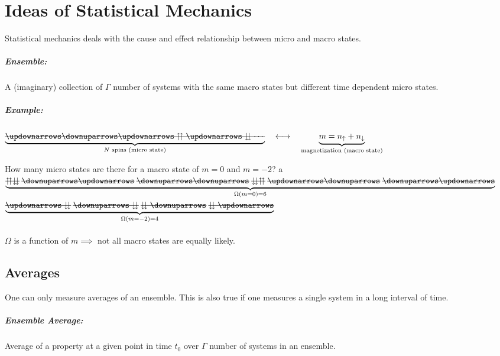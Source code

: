 \chapter{Ideas of Statistical Mechanics}

Statistical mechanics deals with the cause and effect relationship between micro and macro states.
\paragraph{Ensemble:} A (imaginary) collection of $\Gamma$ number of systems with the same macro states but different time dependent micro states.



\paragraph{Example:}

$\underbrace{\stkout{\updownarrows\downuparrows \updownarrows \upuparrows \updownarrows\downdownarrows \cdots}}_{N\textrm{ spins (micro state)}} \quad \longleftrightarrow \quad \underbrace{m=n_\uparrow + n_\downarrow}_\textrm{magnetization (macro state)}$

\begin{problem}{How many micro states are there for a macro state of $m=0$ and $m=-2$?}
a
$\underbrace{
\stkout{\upuparrows\downdownarrows}\;
\stkout{\downuparrows\updownarrows}\;
\stkout{\downuparrows\downuparrows}\;
\stkout{\downdownarrows\upuparrows}\;
\stkout{\updownarrows\downuparrows}\;
\stkout{\downuparrows\updownarrows}}_{\Omega(m=0)=6}$ \quad
$\underbrace{
\stkout{\updownarrows\downdownarrows}\;
\stkout{\downuparrows\downdownarrows}\;
\stkout{\downdownarrows\downuparrows}\;
\stkout{\downdownarrows\updownarrows}}_{\Omega(m=-2)=4}$ \\ \\ $\Omega$ is a function of $m \implies$ not all macro states are equally likely.
\end{problem}

\section{Averages}
One can only measure averages of an ensemble. This is also true if one measures a single system in a long interval of time.
\paragraph{Ensemble Average:}Average of a property at a given point in time $t_0$ over $\Gamma$ number of systems in an ensemble.

